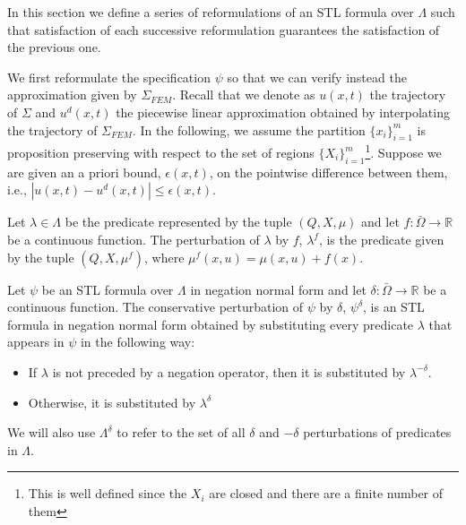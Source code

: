 \documentclass[oribibl]{llncs/llncs}
\newcommand*{\R}{\mathbb{R}}
\begin{document}
In this section we define a series of reformulations of an STL formula over
$\Lambda$ such that satisfaction of each successive reformulation guarantees the
satisfaction of the previous one.

We first reformulate the specification $\psi$ so that we can verify instead the
approximation given by $\Sigma_{FEM}$. Recall that we denote as $u(x,t)$ the
trajectory of $\Sigma$ and $u^d(x, t)$ the piecewise linear approximation
obtained by interpolating the trajectory of $\Sigma_{FEM}$. In the following, we
assume the partition $\{x_i\}_{i=1}^m$ is proposition preserving with respect 
to the set of
regions $\{X_i\}_{i = 1}^{m}$\footnote{This is well defined since the $X_i$ are
closed and there are a finite number of them}. Suppose we are given
an a priori bound, $\epsilon(x, t)$, on the pointwise difference between them, i.e., 
$|u(x, t) - u^d(x, t)| \leq \epsilon(x, t)$.

\begin{definition}
\label{def:m_perturbation}
    Let $\lambda \in \Lambda$ be the predicate represented by the tuple $(Q, X,
    \mu)$ and let $f : \bar\Omega \to \R$ be a continuous function. The perturbation of
    $\lambda$ by $f$, $\lambda^f$, is the predicate given by the tuple $(Q, X,
    \mu^f)$, where $\mu^f(x, u) = \mu(x, u) + f(x)$.
\end{definition}

\begin{definition}
\label{def:delta_perturbation}
    Let $\psi$ be an STL formula over $\Lambda$ in negation normal form 
    and let $\delta : \bar\Omega \to \R$ be a continuous function. The
    conservative perturbation of $\psi$ by $\delta$, $\psi^\delta$, is an STL
    formula in negation normal form obtained by substituting every predicate
    $\lambda$ that appears in $\psi$ in the following way:

    \begin{itemize}
        \item If $\lambda$ is not preceded by a negation operator, then it is
            substituted by $\lambda^{-\delta}$.
        \item Otherwise, it is substituted by $\lambda^{\delta}$
    \end{itemize}

    We will also use $\Lambda^{\delta}$ to refer to the set of all $\delta$ and
    $-\delta$
    perturbations of predicates in $\Lambda$.
\end{definition}
\end{document}
